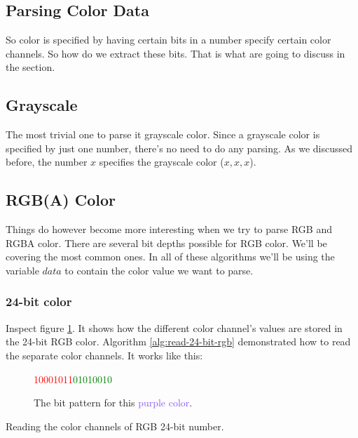 \begin{refsection}
  \section{Parsing Color Data}
  \label{sec:parsing-color-data}

  So color is specified by having certain bits in a number specify
  certain color channels. So how do we extract these bits. That is
  what are going to discuss in the section.

  \subsection{Grayscale}

  The most trivial one to parse it grayscale color. Since a grayscale
  color is specified by just one number, there's no need to do any
  parsing. As we discussed before, the number $x$ specifies the
  grayscale color \mbox{($x,x,x$)}. 

  \subsection{RGB(A) Color}

  Things do however become more interesting when we try to parse RGB
  and RGBA color. There are several bit depths possible for RGB
  color. We'll be covering the most common ones. In all of these
  algorithms we'll be using the variable $data$ to contain the color
  value we want to parse.

  \subsubsection{24-bit color}

  Inspect figure \ref{fig:24-bit-colors-bits}. It shows how the
  different color channel's values are stored in the 24-bit RGB
  color. Algorithm \ref{alg:read-24-bit-rgb} demonstrated how to read
  the separate color channels. It works like this:


  \begin{figure}
    \centering
    {\huge\textcolor{red}{10001011}\textcolor{green}{01010010}\textcolor{blue}{\fullbyte}}
    \label{fig:24-bit-colors-bits}
    \caption{The bit pattern for this \textcolor[HTML]{8B52FF}{purple color}.}
  \end{figure}

  \begin{algorithm}[H]
    \caption{Reading the color channels of RGB 24-bit number.}
    \label{alg:read-24-bit-rgb}
    \begin{algorithmic}[1]
    \end{algorithmic}
  \end{algorithm}


\end{refsection}
